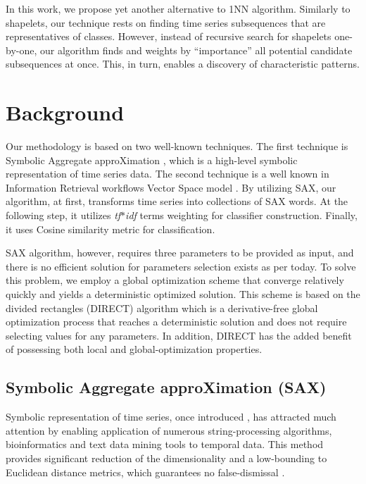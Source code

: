 \documentclass{llncs}
\begin{document}
In this work, we propose yet another alternative to 1NN algorithm. Similarly to shapelets, our
technique rests on finding time series subsequences that are representatives of classes. However,
instead of recursive search for shapelets one-by-one, our algorithm finds and weights by
``importance'' all potential candidate subsequences at once. This, in turn, enables a discovery of
characteristic patterns.

\section{Background}
Our methodology is based on two well-known techniques. The first technique is Symbolic Aggregate
approXimation \cite{sax}, which is a high-level symbolic representation of time series
data. The second technique is a well known in Information Retrieval workflows Vector Space 
model \cite{salton}. By utilizing SAX, our algorithm, at first, transforms time series into collections of 
SAX words. At the following step, it utilizes \textit{tf$\ast$idf} terms weighting for classifier 
construction. Finally, it uses Cosine similarity metric for classification.

SAX algorithm, however, requires three parameters to be provided as input, and there is no efficient 
solution for parameters selection exists as per today. To solve this problem, we employ a global 
optimization scheme that converge relatively quickly and yields a deterministic optimized solution. 
This scheme is based on the divided rectangles (DIRECT) algorithm \cite{direct} which is
a derivative-free global optimization process that reaches a deterministic solution and does
not require  selecting values for any parameters. In addition, DIRECT has the added benefit of
possessing both local and global-optimization properties. 

\subsection{Symbolic Aggregate approXimation (SAX)}
Symbolic representation of time series, once introduced \cite{sax}, has attracted much attention by
enabling application of numerous string-processing algorithms, bioinformatics and text data mining 
tools to temporal data. This method provides significant reduction of the dimensionality and
a low-bounding to Euclidean distance metrics, which guarantees no false-dismissal  \cite{hot_sax}.
\end{document}
